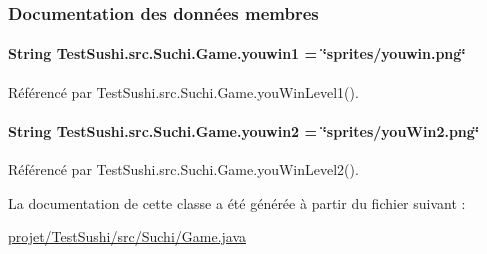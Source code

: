 \subsubsection{Documentation des données membres}
\hypertarget{classTestSushi_1_1src_1_1Suchi_1_1Game_aaac6987e76afc5905150189e9e9b0638}{}
\paragraph[{youwin1}]{\setlength{\rightskip}{0pt plus 5cm}String Test\+Sushi.\+src.\+Suchi.\+Game.\+youwin1 = \char`\"{}sprites/youwin.\+png\char`\"{}\hspace{0.3cm}{\ttfamily [private]}}\label{classTestSushi_1_1src_1_1Suchi_1_1Game_aaac6987e76afc5905150189e9e9b0638}


Référencé par Test\+Sushi.\+src.\+Suchi.\+Game.\+you\+Win\+Level1().

\hypertarget{classTestSushi_1_1src_1_1Suchi_1_1Game_aca3e6d370eca4c7f5e9968998f87bce7}{}
\paragraph[{youwin2}]{\setlength{\rightskip}{0pt plus 5cm}String Test\+Sushi.\+src.\+Suchi.\+Game.\+youwin2 = \char`\"{}sprites/you\+Win2.\+png\char`\"{}\hspace{0.3cm}{\ttfamily [private]}}\label{classTestSushi_1_1src_1_1Suchi_1_1Game_aca3e6d370eca4c7f5e9968998f87bce7}


Référencé par Test\+Sushi.\+src.\+Suchi.\+Game.\+you\+Win\+Level2().



La documentation de cette classe a été générée à partir du fichier suivant \+:\begin{DoxyCompactItemize}
\item 
\hyperlink{projet_2TestSushi_2src_2Suchi_2Game_8java}{projet/\+Test\+Sushi/src/\+Suchi/\+Game.\+java}\end{DoxyCompactItemize}
